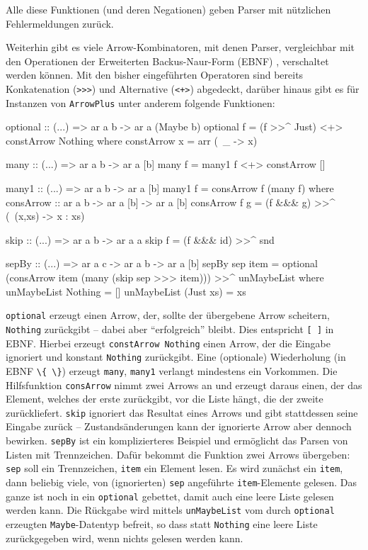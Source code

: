 \documentclass[11pt, a4paper, bibgerm]{scrbook}
\newenvironment{DIFnomarkup}{}{}
\newcommand\icode[1]{\lstinline?#1?}
\begin{document}
Alle diese Funktionen (und deren Negationen) geben Parser mit nützlichen
Fehlermeldungen zurück.

Weiterhin gibt es viele Arrow-Kombinatoren, mit denen Parser,
vergleichbar mit den Operationen der Erweiterten Backus-Naur-Form (EBNF)
\cite[S.43ff]{EBNF}, verschaltet werden können. Mit den bisher eingeführten
Operatoren sind bereits Konkatenation (\icode{>>>}) %
und Alternative (\icode{<+>}) abgedeckt, darüber hinaus gibt es für
Instanzen von \icode{ArrowPlus} unter anderem folgende Funktionen:

\begin{DIFnomarkup}\begin{code}
optional :: (...) => ar a b -> ar a (Maybe b)
optional f = (f >>^ Just) <+> constArrow Nothing
  where constArrow x = arr (\ _ -> x)

many :: (...) => ar a b -> ar a [b]
many f = many1 f <+> constArrow []

many1 :: (...) => ar a b -> ar a [b]
many1 f = consArrow f (many f)
  where consArrow :: ar a b -> ar a [b] -> ar a [b]
        consArrow f g = (f &&& g) >>^ (\ (x,xs) -> x : xs)

skip :: (...) => ar a b -> ar a a
skip f = (f &&& id) >>^ snd

sepBy :: (...) => ar a c -> ar a b -> ar a [b]
sepBy sep item =
  optional (consArrow item (many (skip sep >>> item))) >>^ unMaybeList
    where
      unMaybeList  Nothing  = []
      unMaybeList (Just xs) = xs
\end{code}\end{DIFnomarkup} %

\icode{optional} erzeugt einen Arrow, der, sollte der übergebene Arrow
scheitern, \icode{Nothing} zurückgibt -- dabei aber "`erfolgreich"'
bleibt. Dies entspricht \icode{[ ]} in EBNF. Hierbei erzeugt
\icode{constArrow Nothing} einen Arrow, der die Eingabe ignoriert und
konstant \icode{Nothing} zurückgibt. Eine (optionale) Wiederholung (in EBNF
\icode{\{ \}}) erzeugt \icode{many}, \icode{many1} verlangt mindestens
ein Vorkommen. Die Hilfsfunktion \icode{consArrow} nimmt zwei
Arrows an und erzeugt daraus einen, der das Element, welches der erste
zurückgibt, vor die Liste hängt, die der zweite zurückliefert.
\icode{skip} ignoriert das Resultat eines Arrows und gibt
stattdessen seine Eingabe zurück -- Zustandsänderungen kann der
ignorierte Arrow aber dennoch bewirken. \icode{sepBy} ist ein
komplizierteres Beispiel und ermöglicht das Parsen von Listen mit
Trennzeichen. Dafür bekommt die Funktion zwei Arrows übergeben:
\icode{sep} soll ein Trennzeichen, \icode{item} ein Element lesen. Es
wird zunächst ein \icode{item}, dann beliebig viele, von (ignorierten)
\icode{sep} angeführte \icode{item}-Elemente gelesen. Das ganze ist noch
in ein \icode{optional} gebettet, damit auch eine leere Liste gelesen
werden kann. Die Rückgabe wird mittels \icode{unMaybeList} vom durch
\icode{optional} erzeugten \icode{Maybe}-Datentyp befreit, so dass statt
\icode{Nothing} eine leere Liste zurückgegeben wird, wenn nichts gelesen
werden kann.
\end{document}
